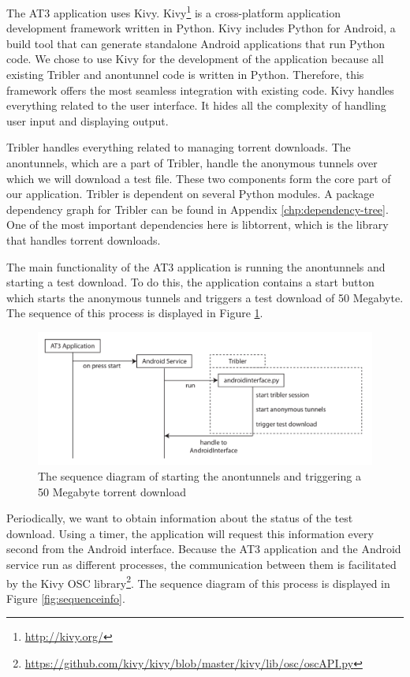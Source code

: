 The AT3 application uses Kivy. Kivy\footnote{\url{http://kivy.org/}} is a cross-platform application development framework written in Python. Kivy includes Python for Android, a build tool that can generate standalone Android applications that run Python code. We chose to use Kivy for the development of the application because all existing Tribler and anontunnel code is written in Python. Therefore, this framework offers the most seamless integration with existing code. Kivy handles everything related to the user interface. It hides all the complexity of handling user input and displaying output.

Tribler handles everything related to managing torrent downloads. The anontunnels, which are a part of Tribler, handle the anonymous tunnels over which we will download a test file. These two components form the core part of our application. Tribler is dependent on several Python modules. A package dependency graph for Tribler can be found in Appendix \ref{chp:dependency-tree}. One of the most important dependencies here is libtorrent, which is the library that handles torrent downloads.

The main functionality of the AT3 application is running the anontunnels and starting a test download. To do this, the application contains a start button which starts the anonymous tunnels and triggers a test download of 50 Megabyte. The sequence of this process is displayed in Figure \ref{fig:sequencestart}.

\begin{figure}[!h]
	\centering
	\includegraphics[width=\textwidth]{graphics/sequence-start.pdf}
	\caption{The sequence diagram of starting the anontunnels and triggering a 50 Megabyte torrent download}
	\label{fig:sequencestart}
\end{figure}

Periodically, we want to obtain information about the status of the test download. Using a timer, the application will request this information every second from the Android interface. Because the AT3 application and the Android service run as different processes, the communication between them is facilitated by the Kivy OSC library\footnote{\url{https://github.com/kivy/kivy/blob/master/kivy/lib/osc/oscAPI.py}}. The sequence diagram of this process is displayed in Figure \ref{fig:sequenceinfo}.

